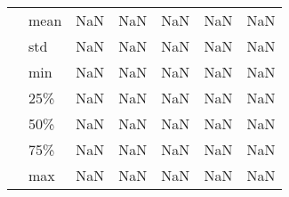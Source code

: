 \begin{tabular}{llrrrrr}
        & mean &           NaN &           NaN &           NaN &           NaN &           NaN \\
        & std &           NaN &           NaN &           NaN &           NaN &           NaN \\
        & min &           NaN &           NaN &           NaN &           NaN &           NaN \\
        & 25\% &           NaN &           NaN &           NaN &           NaN &           NaN \\
        & 50\% &           NaN &           NaN &           NaN &           NaN &           NaN \\
        & 75\% &           NaN &           NaN &           NaN &           NaN &           NaN \\
        & max &           NaN &           NaN &           NaN &           NaN &           NaN \\
\bottomrule
\end{tabular}
